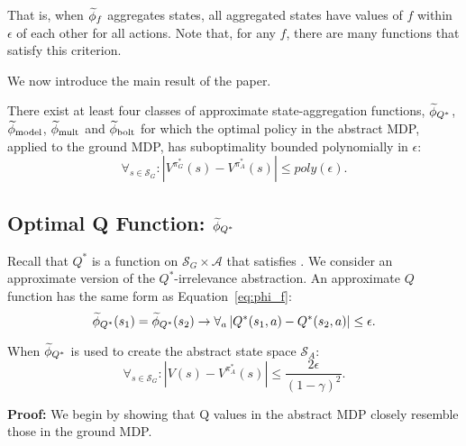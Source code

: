 That is, when $\widetilde \phi_f$ aggregates states, all aggregated states have values of $f$ within $\epsilon$ of each other for all actions. Note that, for any $f$, there are many functions that satisfy this criterion.

We now introduce the main result of the paper.

\begin{thm}
There exist at least four classes of approximate state-aggregation functions, $\widetilde \phi_{Q^*}$, $\widetilde \phi_{\text{model}}$, $\widetilde \phi_{\text{mult}}$ and $\widetilde \phi_{\text{bolt}}$ for which the optimal policy in the abstract \ac{MDP}, applied to the ground \ac{MDP}, has suboptimality bounded polynomially in $\epsilon$:
\begin{equation}
\forall_{s \in \mathcal{S}_G}: | V^{\pi^*_G}(s) - V^{\pi^*_{A}}(s) | \leq poly(\epsilon).
\end{equation}
\end{thm}


\subsection{Optimal Q Function: $\widetilde \phi_{Q^*}$}

Recall that $Q^*$ is a function on $\mathcal{S}_G \times \mathcal{A}$ that satisfies . We consider an approximate version of the $Q^*$-irrelevance abstraction. An approximate $Q$ function has the same form as Equation~\ref{eq:phi_f}:
\begin{equation}
\widetilde \phi_{Q^*}(s_1) = \widetilde \phi_{Q^*}(s_2) \rightarrow \forall_a \left|Q^*(s_1, a) - Q^*(s_2, a)\right| \leq \epsilon.
\end{equation}

\begin{lma}
\label{lma:Q*}
When $\widetilde \phi_{Q^*}$ is used to create the abstract state space $\mathcal{S}_A$:
\begin{equation}
\forall_{s \in \mathcal{S}_G}: | V(s) - V^{\pi^*_{A}}(s) | \leq \frac{2\epsilon}{(1-\gamma)^2}.
\end{equation}
\end{lma}

\textbf{Proof:}
We begin by showing that Q values in the abstract \ac{MDP} closely resemble those in the ground \ac{MDP}.

